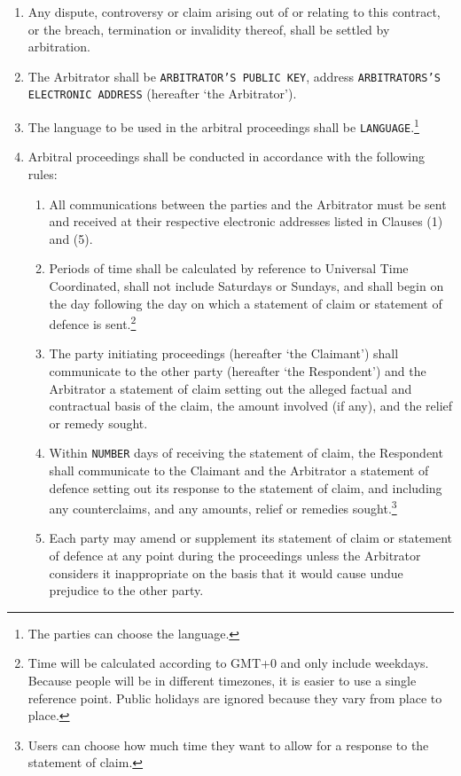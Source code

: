 \documentclass[a4paper,12pt]{article}
\begin{document}
\begin{enumerate}[resume]
	\item Any dispute, controversy or claim arising out of or relating to this contract, or the breach, termination or invalidity thereof, shall be settled by arbitration.
	\item The Arbitrator shall be \texttt{\colorbox{branding}{ARBITRATOR'S PUBLIC KEY}}, address \texttt{\colorbox{branding}{ARBITRATORS'S ELECTRONIC ADDRESS}} (hereafter `the Arbitrator').
	\item The language to be used in the arbitral proceedings shall be \texttt{\colorbox{branding}{LANGUAGE}}.\footnote{The parties can choose the language.}
	\item Arbitral proceedings shall be conducted in accordance with the following rules:
	\begin{enumerate}
		\item All communications between the parties and the Arbitrator must be sent and received at their respective electronic addresses listed in Clauses (1) and (5).
		\item Periods of time shall be calculated by reference to Universal Time Coordinated, shall not include Saturdays or Sundays, and shall begin on the day following the day on which a statement of claim or statement of defence is sent.\footnote{Time will be calculated according to GMT+0 and only include weekdays. Because people will be in different timezones, it is easier to use a single reference point. Public holidays are ignored because they vary from place to place.}
		\item The party initiating proceedings (hereafter `the Claimant') shall communicate to the other party (hereafter `the Respondent') and the Arbitrator a statement of claim setting out the alleged factual and contractual basis of the claim, the amount involved (if any), and the relief or remedy sought.
		\item Within \texttt{\colorbox{branding}{NUMBER}} days of receiving the statement of claim, the Respondent shall communicate to the Claimant and the Arbitrator a statement of defence setting out its response to the statement of claim, and including any counterclaims, and any amounts, relief or remedies sought.\footnote{Users can choose how much time they want to allow for a response to the statement of claim.}
		\item Each party may amend or supplement its statement of claim or statement of defence at any point during the proceedings unless the Arbitrator considers it inappropriate on the basis that it would cause undue prejudice to the other party.

\end{enumerate}
\end{enumerate}
\end{document}
